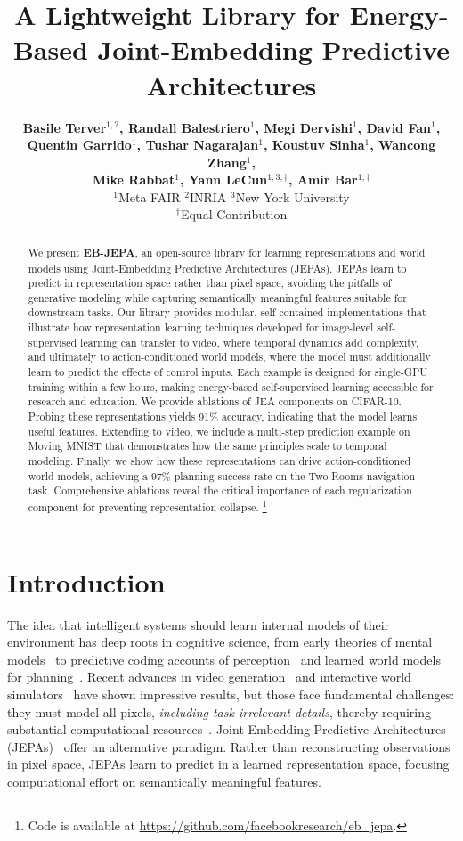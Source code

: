 \documentclass{article}
\title{A Lightweight Library for Energy-Based Joint-Embedding Predictive Architectures}
\author{\textbf{Basile Terver$^{1,2}$, Randall Balestriero$^1$, Megi Dervishi$^1$, David Fan$^1$,}\\
\textbf{Quentin Garrido$^1$, Tushar Nagarajan$^1$, Koustuv Sinha$^1$, Wancong Zhang$^1$,}\\
\textbf{Mike Rabbat$^{1}$, Yann LeCun$^{1,3,\dag}$, Amir Bar$^{1,\dag}$}
\\
$^1$Meta FAIR \quad $^2$INRIA \quad $^3$New York University\\
$^\dag$Equal Contribution
}
\begin{document}
\maketitle
{}

\begin{abstract}
We present \textbf{EB-JEPA}, an open-source library for learning representations and world models using Joint-Embedding Predictive Architectures (JEPAs).
JEPAs learn to predict in representation space rather than pixel space, avoiding the pitfalls of generative modeling while capturing semantically meaningful features suitable for downstream tasks.
Our library provides modular, self-contained implementations that illustrate how representation learning techniques developed for image-level self-supervised learning can transfer to video, where temporal dynamics add complexity, and ultimately to action-conditioned world models, where the model must additionally learn to predict the effects of control inputs.
Each example is designed for single-GPU training within a few hours, making energy-based self-supervised learning accessible for research and education.
We provide ablations of JEA components on CIFAR-10. Probing these representations yields 91\% accuracy, indicating that the model learns useful features. Extending to video, we include a multi-step prediction example on Moving MNIST that demonstrates how the same principles scale to temporal modeling. Finally, we show how these representations can drive action-conditioned world models, achieving a 97\% planning success rate on the Two Rooms navigation task.
Comprehensive ablations reveal the critical importance of each regularization component for preventing representation collapse.
\footnote{Code is available at \url{https://github.com/facebookresearch/eb_jepa}.}
\end{abstract}


\section{Introduction}


The idea that intelligent systems should learn internal models of their environment has deep roots in cognitive science, from early theories of mental models~\citep{craik1967nature} to predictive coding accounts of perception~\citep{Rao99} and learned world models for planning~\citep{Dyna1991,Schmidhuber1990}.
Recent advances in video generation~\citep{brooks2024video,blattmann2023stablevideodiffusionscaling} and interactive world simulators~\citep{bruce2024genie,genie2} have shown impressive results, but those face fundamental challenges: they must model all pixels, {\em including task-irrelevant details}, thereby requiring substantial computational resources~\citep{ReconstructionUninformativebalestriero24b}.
Joint-Embedding Predictive Architectures (JEPAs)~\citep{PathAMI,IJEPA,VJEPA} offer an alternative paradigm.
Rather than reconstructing observations in pixel space, JEPAs learn to predict in a learned representation space, focusing computational effort on semantically meaningful features.
\end{document}
